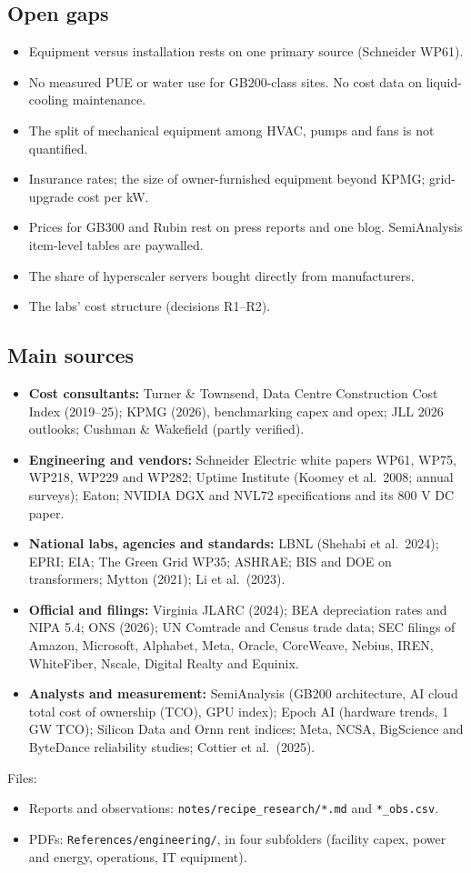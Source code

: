 \subsection{Open gaps}
\begin{itemize}
  \item Equipment versus installation rests on one primary source (Schneider WP61).
  \item No measured PUE or water use for GB200-class sites. No cost data on liquid-cooling
    maintenance.
  \item The split of mechanical equipment among HVAC, pumps and fans is not quantified.
  \item Insurance rates; the size of owner-furnished equipment beyond KPMG; grid-upgrade cost per
    kW.
  \item Prices for GB300 and Rubin rest on press reports and one blog. SemiAnalysis item-level
    tables are paywalled.
  \item The share of hyperscaler servers bought directly from manufacturers.
  \item The labs' cost structure (decisions R1--R2).
\end{itemize}

\subsection{Main sources}
\begin{itemize}
  \item \textbf{Cost consultants:} Turner \& Townsend, Data Centre Construction Cost Index
    (2019--25); KPMG (2026), benchmarking capex and opex; JLL 2026 outlooks; Cushman \& Wakefield
    (partly verified).
  \item \textbf{Engineering and vendors:} Schneider Electric white papers WP61, WP75, WP218,
    WP229 and WP282; Uptime Institute (Koomey et al.\ 2008; annual surveys); Eaton; NVIDIA DGX and
    NVL72 specifications and its 800 V DC paper.
  \item \textbf{National labs, agencies and standards:} LBNL (Shehabi et al.\ 2024); EPRI; EIA;
    The Green Grid WP35; ASHRAE; BIS and DOE on transformers; Mytton (2021); Li et al.\ (2023).
  \item \textbf{Official and filings:} Virginia JLARC (2024); BEA depreciation rates and NIPA 5.4;
    ONS (2026); UN Comtrade and Census trade data; SEC filings of Amazon, Microsoft, Alphabet,
    Meta, Oracle, CoreWeave, Nebius, IREN, WhiteFiber, Nscale, Digital Realty and Equinix.
  \item \textbf{Analysts and measurement:} SemiAnalysis (GB200 architecture, AI cloud total cost
    of ownership (TCO), GPU index); Epoch AI (hardware trends, 1 GW TCO); Silicon Data and Ornn
    rent indices; Meta, NCSA, BigScience and ByteDance reliability studies; Cottier et al.\
    (2025).
\end{itemize}
Files:
\begin{itemize}
  \item Reports and observations: \texttt{notes/recipe\_research/*.md} and \texttt{*\_obs.csv}.
  \item PDFs: \texttt{References/engineering/}, in four subfolders (facility capex, power and
    energy, operations, IT equipment).
\end{itemize}
